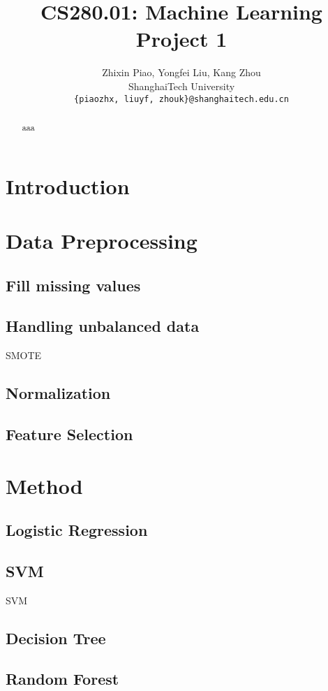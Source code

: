 \documentclass[10pt,twocolumn,letterpaper]{article}
\begin{document}
\title{CS280.01: Machine Learning\\ Project 1}

\author{Zhixin Piao, Yongfei Liu, Kang Zhou\\
ShanghaiTech University\\
{\tt\small { \{piaozhx, liuyf, zhouk\}@shanghaitech.edu.cn}
}}

\maketitle

\begin{abstract}
   aaa
\end{abstract}

\section{Introduction}


\section{Data Preprocessing}
\subsection{Fill missing values}

\subsection{Handling 	unbalanced data}
SMOTE

\subsection{Normalization}

\subsection{}

\subsection{Feature Selection}



\section{Method}
\subsection{Logistic Regression}

\subsection{SVM}
SVM\cite{SVM}


\subsection{Decision Tree}

\subsection{Random Forest}



{\small


}
\end{document}
